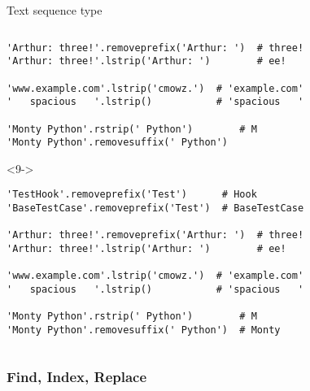\begin{frame}[fragile]{Text sequence type}
\begin{columns}[onlytextwidth]
\begin{column}{\textwidth}
\begin{onlyenv}
\begin{lstlisting}[style=python,basicstyle=\ttfamily\small,keepspaces=true,columns=fullflexible]
'Arthur: three!'.removeprefix('Arthur: ')  # three!
'Arthur: three!'.lstrip('Arthur: ')        # ee!

'www.example.com'.lstrip('cmowz.')  # 'example.com'
'   spacious   '.lstrip()           # 'spacious   '

'Monty Python'.rstrip(' Python')        # M
'Monty Python'.removesuffix(' Python') \end{lstlisting}
      \end{onlyenv}

      \begin{onlyenv}<9->
        \begin{lstlisting}[style=python,basicstyle=\ttfamily\small,keepspaces=true,columns=fullflexible]
'TestHook'.removeprefix('Test')      # Hook
'BaseTestCase'.removeprefix('Test')  # BaseTestCase

'Arthur: three!'.removeprefix('Arthur: ')  # three!
'Arthur: three!'.lstrip('Arthur: ')        # ee!

'www.example.com'.lstrip('cmowz.')  # 'example.com'
'   spacious   '.lstrip()           # 'spacious   '

'Monty Python'.rstrip(' Python')        # M
'Monty Python'.removesuffix(' Python')  # Monty \end{lstlisting}
      \end{onlyenv}

    \end{column}
  \end{columns}

\end{frame}


\subsubsection{Find, Index, Replace}


